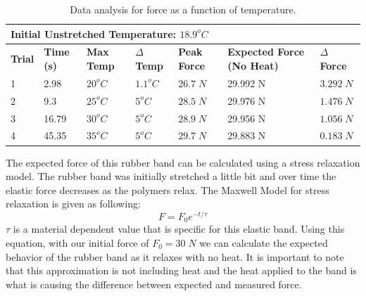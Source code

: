 \documentclass[12pt]{article}     %
\begin{document}
\begin{table}[!h]
    \centering
    \caption{Data analysis for force as a function of temperature.}
    \label{tab:exp2}
    \renewcommand{\arraystretch}{1.5}
    \begin{tabular}{@{}p{1cm} p{1.5cm} p{2cm} p{2cm} p{1.5cm} p{2cm} p{1.5cm}@{}}
        \toprule
        \multicolumn{7}{l}{\textbf{Initial Unstretched Temperature: $18.9^{o}C$}} \\
        \midrule
        \textbf{Trial} & \textbf{Time (s)} & \textbf{Max Temp} & \textbf{$\Delta$ Temp} & \textbf{Peak Force} & \textbf{Expected Force (No Heat)} & \textbf{$\Delta$ Force} \\
        \midrule
        1 & 2.98 & $20^{o}C$&$1.1^{o}C$ & $26.7\;N$ & 29.992 N & $3.292 \;N$ \\
        \midrule
        2 & 9.3 & $25^{o}C$&$5^{o}C$ & $28.5\;N$ & 29.976 N & $1.476\;N$\\
        \midrule
        3 & 16.79 & $30^{o}C$&$5^{o}C$ & $28.9\;N$ & 29.956 N & $1.056\;N$\\
        \midrule
        4 & 45.35 & $35^{o}C$&$5^{o}C$ & $29.7\;N$ & 29.883 N & $0.183\;N$\\
        \bottomrule
    \end{tabular}
\end{table}




The expected force of this rubber band can be calculated using a stress relaxation model. The rubber band was initially stretched a little bit and over time the elastic force decreases as the polymers relax. The Maxwell Model for stress relaxation is given as following: 
    $$F = F_0e^{-t/\tau}$$
$\tau$ is a material dependent value that is specific for this elastic band. Using this equation, with our initial force of $F_0 = 30 \;N$ we can calculate the expected behavior of the rubber band as it relaxes with no heat. It is important to note that this approximation is not including heat and the heat applied to the band is what is causing the difference between expected and measured force. 
\end{document}
